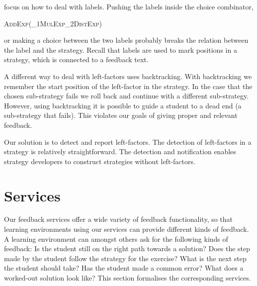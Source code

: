 \documentclass[copyright]{eptcs}
\newcommand{\Varid}[1]{\mathit{#1}}
\def\resethooks{\global\let\SaveRestoreHook\empty
  \global\let\ColumnHook\empty}
\let\hspost\empty
\begin{document}
focus on how to deal with labels. Pushing the labels inside the choice
combinator,
\begin{hscode}\SaveRestoreHook
\column{B}{@{}>{\hspre}l<{\hspost}@{}}\column{4}{@{}>{\hspre}l<{\hspost}@{}}\column{E}{@{}>{\hspre}l<{\hspost}@{}}\>[4]{}\Varid{leftStrat'}\mathrel{=}\textsc{AddExp}\mathrel{{<}\hspace{-0.4em}\star\hspace{-0.4em}{>}}(\ell_1\;\textsc{MulExp}\mathrel{{<}\hspace{-0.4em}\mid\hspace{-0.4em}{>}}\ell_2\;\textsc{DistExp}){}\<[E]\ColumnHook
\end{hscode}\resethooks
or making a choice between the two labels probably breaks the relation between
the label and the strategy. Recall that labels are used to mark positions in a
strategy, which is connected to a feedback text.

A different way to deal with left-factors uses backtracking. With backtracking
we remember the start position of the left-factor in the strategy. In the case
that the chosen sub-strategy fails we roll back and continue with a different
sub-strategy. However, using backtracking it is possible to guide a student to a
dead end (a sub-strategy that fails). This violates our goals of giving proper
and relevant feedback.

Our solution is to detect and report left-factors. The detection of left-factors
in a strategy is relatively straightforward. The detection and notification
enables strategy developers to construct strategies without left-factors.


\section{Services}
\label{sec:services}
Our feedback services offer a wide variety of feedback functionality, so that
learning environments using our services can provide different kinds of
feedback. A learning environment can amongst others ask for the following kinds
of feedback: Is the student still on the right path towards a solution? Does the
step made by the student follow the strategy for the exercise? What is the next
step the student should take? Has the student made a common error? What does a
worked-out solution look like? This section formalises the corresponding 
services.
\end{document}
